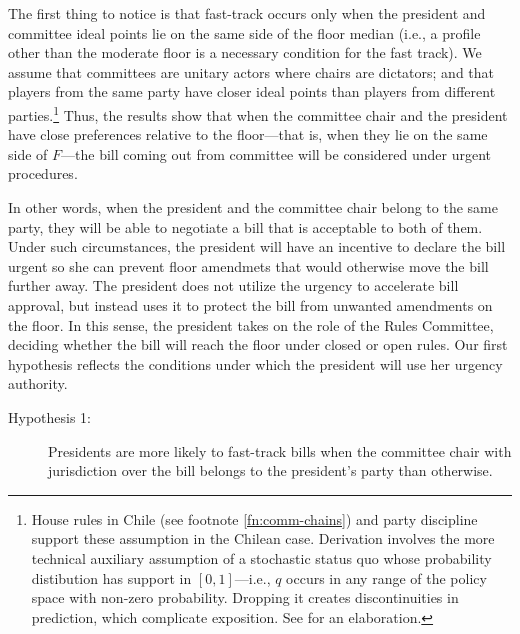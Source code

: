 \documentclass[letter,12pt]{article}
\begin{document}
The first thing to notice is that fast-track occurs only when the president and committee ideal points lie on the same side of the floor median (i.e., a profile other than the moderate floor is a necessary condition for the fast track). We assume that committees are unitary actors where chairs are dictators; and that players from the same party have closer ideal points than players from different parties.\footnote{House rules in Chile (see footnote \ref{fn:comm-chains}) and party discipline \citep{aleman.saiegh.coalUnityChile.2007,carey.2002} support these assumption in the Chilean case. Derivation involves the more technical auxiliary assumption of a stochastic status quo whose probability distibution has support in $[0,1]$---i.e., $q$ occurs in any range of the policy space with non-zero probability. Dropping it creates discontinuities in prediction, which complicate exposition. See \citet[, 38]{cox.mccubbins.2005} for an elaboration.} Thus, the results show that when the committee chair and the president have close preferences relative to the floor---that is, when they lie on the same side of $F$---the bill coming out from committee will be considered under urgent procedures. 

In other words, when the president and the committee chair belong to the same party, they will be able to negotiate a bill that is acceptable to both of them. Under such circumstances, the president will have an incentive to declare the bill urgent so she can prevent floor amendmets that would otherwise move the bill further away. The president does not utilize the urgency to accelerate bill approval, but instead uses it to protect the bill from unwanted amendments on the floor. In this sense, the president takes on the role of the Rules Committee, deciding whether the bill will reach the floor under closed or open rules. Our first hypothesis reflects the conditions under which the president will use her urgency authority.


\begin{description}
  \item [Hypothesis 1:] Presidents are more likely to fast-track bills when the committee chair with jurisdiction over the bill  belongs to the president's party than otherwise.
\end{description}
\end{document}
